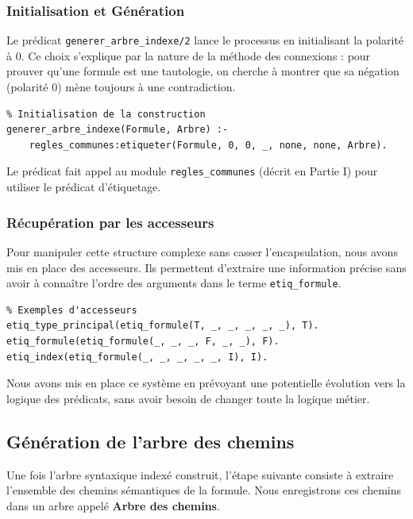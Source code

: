 \documentclass[12pt, a4paper]{article}
\begin{document}
\subsubsection{Initialisation et Génération}

Le prédicat \texttt{generer\_arbre\_indexe/2} lance le processus en initialisant la polarité à $0$. Ce choix s'explique par la nature de la méthode des connexions : pour prouver qu'une formule est une tautologie, on cherche à montrer que sa négation (polarité 0) mène toujours à une contradiction.

\begin{lstlisting}
% Initialisation de la construction
generer_arbre_indexe(Formule, Arbre) :-
    regles_communes:etiqueter(Formule, 0, 0, _, none, none, Arbre).
\end{lstlisting}

Le prédicat fait appel au module \texttt{regles\_communes} (décrit en Partie I) pour utiliser le prédicat d'étiquetage.

\subsubsection{Récupération par les accesseurs}

Pour manipuler cette structure complexe sans casser l'encapsulation, nous avons mis en place des accesseurs. Ils permettent d'extraire une information précise sans avoir à connaître l'ordre des arguments dans le terme \texttt{etiq\_formule}.

\begin{lstlisting}
% Exemples d'accesseurs
etiq_type_principal(etiq_formule(T, _, _, _, _, _), T).
etiq_formule(etiq_formule(_, _, _, F, _, _), F).
etiq_index(etiq_formule(_, _, _, _, _, I), I).
\end{lstlisting}

Nous avons mis en place ce système en prévoyant une potentielle évolution vers la logique des prédicats, sans avoir besoin de changer toute la logique métier.

\subsection{Génération de l'arbre des chemins}

Une fois l'arbre syntaxique indexé construit, l'étape suivante consiste à extraire l'ensemble des chemins sémantiques de la formule. Nous enregistrons ces chemins dans un arbre appelé \textbf{Arbre des chemins}.
\end{document}
